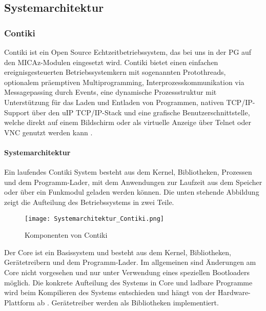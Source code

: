 \subsection{Systemarchitektur}

\subsubsection{Contiki}
Contiki ist ein Open Source Echtzeitbetriebssystem, das bei uns in der PG auf den MICAz-Modulen eingesetzt wird.
Contiki bietet einen einfachen ereignisgesteuerten Betriebssystemkern mit sogenannten Protothreads, optionalem 
pr\"aemptiven Multiprogramming, Interprozesskommunikation via Messagepassing durch Events, eine dynamische Prozessstruktur
mit Unterst\"utzung f\"ur das Laden und Entladen von Programmen, nativen TCP/IP-Support über den uIP TCP/IP-Stack und eine 
grafische Benutzerschnittstelle, welche direkt auf einem Bildschirm oder als virtuelle Anzeige \"uber Telnet oder VNC genutzt werden kann \cite{Wikipedia:2013:Online}.
 
\paragraph{Systemarchitektur}
Ein laufendes Contiki System besteht aus dem Kernel, Bibliotheken, Prozessen und dem Programm-Lader, mit dem Anwendungen zur Laufzeit aus dem Speicher oder \"uber ein Funkmodul geladen werden k\"onnen.
Die unten stehende Abbildung zeigt die Aufteilung des Betriebssystems in zwei Teile. 
\begin{figure}[h!]
	\centering
		\texttt{[image: Systemarchitektur\_Contiki.png]}
	\caption{Komponenten von Contiki \cite{Dunkels:Groenvall:Voigt:2014:Online}}
	\label{Systemarchitektur von Contiki}
\end{figure}
Der Core ist ein Basissystem und besteht aus dem Kernel, Bibliotheken, Ger\"{a}tetreibern und dem Programm-Lader. 
Im allgemeinen sind \"Anderungen am Core nicht vorgesehen und nur unter Verwendung eines speziellen Bootloaders m\"oglich. 
Die konkrete Aufteilung des Systems in Core und ladbare Programme wird beim Kompilieren des Systems entschieden und h\"angt 
von der Hardware-Plattform ab \cite[vgl.][S. 7]{Walter:2010}. Ger\"atetreiber werden als Bibliotheken implementiert. 


